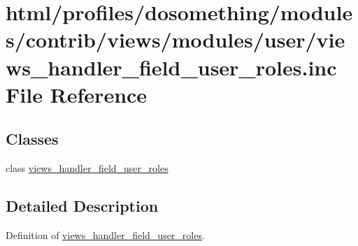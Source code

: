 \hypertarget{views__handler__field__user__roles_8inc}{
\section{html/profiles/dosomething/modules/contrib/views/modules/user/views\_\-handler\_\-field\_\-user\_\-roles.inc File Reference}
\label{views__handler__field__user__roles_8inc}
}
\subsection*{Classes}
\begin{DoxyCompactItemize}
\item 
class \hyperlink{classviews__handler__field__user__roles}{views\_\-handler\_\-field\_\-user\_\-roles}
\end{DoxyCompactItemize}


\subsection{Detailed Description}
Definition of \hyperlink{classviews__handler__field__user__roles}{views\_\-handler\_\-field\_\-user\_\-roles}. 